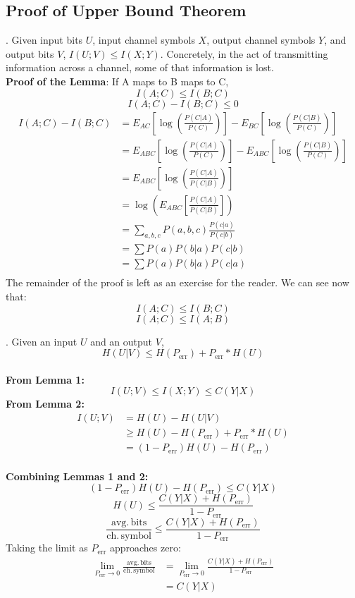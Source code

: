 \documentclass[11pt]{article}
\theoremstyle{definition}
\begin{document}
\subsection{Proof of Upper Bound Theorem}
. Given input bits $U$, input channel symbols $X$, output channel symbols $Y$, and output bits $V$, $I(U;V) \leq I(X;Y)$. Concretely, in the act of transmitting information across a channel, some of that information is lost. \\
{\bf Proof of the Lemma}: 
If A maps to B maps to C,
$$I(A;C) \leq I(B;C)$$
$$I(A;C) - I(B;C) \leq 0$$
\begin{align*}
	I(A;C) - I(B;C) 	&= E_{AC}\left[\log \left(\frac{P(C|A)}{P(C)} \right)\right] - E_{BC}\left[\log \left(\frac{P(C|B)}{P(C)} \right)\right]\\
				&= E_{ABC}\left[\log \left(\frac{P(C|A)}{P(C)} \right)\right] - E_{ABC}\left[\log \left(\frac{P(C|B)}{P(C)} \right)\right]\\
				&= E_{ABC}\left[\log \left(\frac{P(C|A)}{P(C|B)}\right) \right]\\
				&= \log \left(E_{ABC}\left[\frac{P(C|A)}{P(C|B)}\right]\right)\\
				&= \sum_{a,b,c} P(a,b,c) \frac{P(c|a)}{P(c|b)}\\
				&= \sum P(a) P(b|a) P(c|b)\\
				&= \sum P(a) P(b|a) P(c|a)\\
\end{align*}
The remainder of the proof is left as an exercise for the reader. We can see now that: 
$$I(A;C) \leq I(B;C)$$
$$I(A;C) \leq I(A;B)$$

. Given an input $U$ and an output $V$, 
$$H(U|V) \leq H(P_{\mathrm{err}}) + P_{\mathrm{err}} * H(U)$$
\\
{\bf From Lemma 1:}
$$I(U;V) \leq I(X;Y) \leq C(Y|X)$$
{\bf From Lemma 2:}
\begin{align*}
I(U;V) 	&= H(U) - H(U|V)\\
		&\geq H(U) - H(P_{\mathrm{err}}) + P_{\mathrm{err}} * H(U) \\
		&= (1 - P_{\mathrm{err}})H(U) - H(P_{\mathrm{err}})
\end{align*}
\\
{\bf Combining Lemmas 1 and 2:}
$$(1 - P_{\mathrm{err}})H(U) - H(P_{\mathrm{err}}) \leq C(Y|X)$$
$$H(U) \leq  \frac{C(Y|X) + H(P_{\mathrm{err}})}{1 - P_{\mathrm{err}}}$$
$$\frac{\mathrm{avg. \, bits}}{\mathrm{ch. \, symbol}} \leq \frac{C(Y|X) + H(P_{\mathrm{err}})}{1 - P_{\mathrm{err}}}$$
Taking the limit as $P_{\mathrm{err}}$ approaches zero:
\begin{align*}
	\lim_{P_{\mathrm{err}} \to 0} \frac{\mathrm{avg. \, bits}}{\mathrm{ch. \, symbol}} &= \lim_{P_{\mathrm{err}} \to 0} \frac{C(Y|X) + H(P_{\mathrm{err}})}{1 - P_{\mathrm{err}}}\\
	&= C(Y|X)
\end{align*}
\end{document}
